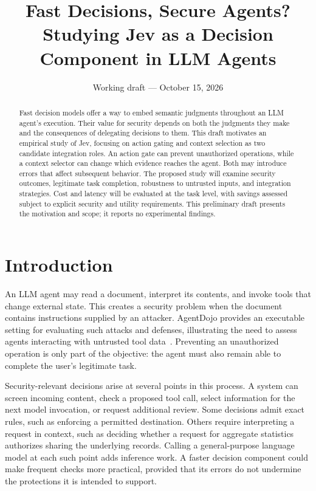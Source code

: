 \documentclass[11pt,a4paper]{article}
\title{Fast Decisions, Secure Agents?\\[0.3em]
  \large Studying Jev as a Decision Component in LLM Agents}
\author{}
\date{Working draft --- October 15, 2026}
\begin{document}
\maketitle
\vspace{-1.5em}
\begin{abstract}
Fast decision models offer a way to embed semantic judgments throughout an LLM agent's execution. Their value for security depends on both the judgments they make and the consequences of delegating decisions to them. This draft motivates an empirical study of Jev, focusing on action gating and context selection as two candidate integration roles. An action gate can prevent unauthorized operations, while a context selector can change which evidence reaches the agent. Both may introduce errors that affect subsequent behavior. The proposed study will examine security outcomes, legitimate task completion, robustness to untrusted inputs, and integration strategies. Cost and latency will be evaluated at the task level, with savings assessed subject to explicit security and utility requirements. This preliminary draft presents the motivation and scope; it reports no experimental findings.
\end{abstract}

\section{Introduction}
An LLM agent may read a document, interpret its contents, and invoke tools that change external state. This creates a security problem when the document contains instructions supplied by an attacker. AgentDojo provides an executable setting for evaluating such attacks and defenses, illustrating the need to assess agents interacting with untrusted tool data~\cite{agentdojo}. Preventing an unauthorized operation is only part of the objective: the agent must also remain able to complete the user's legitimate task.

Security-relevant decisions arise at several points in this process. A system can screen incoming content, check a proposed tool call, select information for the next model invocation, or request additional review. Some decisions admit exact rules, such as enforcing a permitted destination. Others require interpreting a request in context, such as deciding whether a request for aggregate statistics authorizes sharing the underlying records. Calling a general-purpose language model at each such point adds inference work. A faster decision component could make frequent checks more practical, provided that its errors do not undermine the protections it is intended to support.
\end{document}
